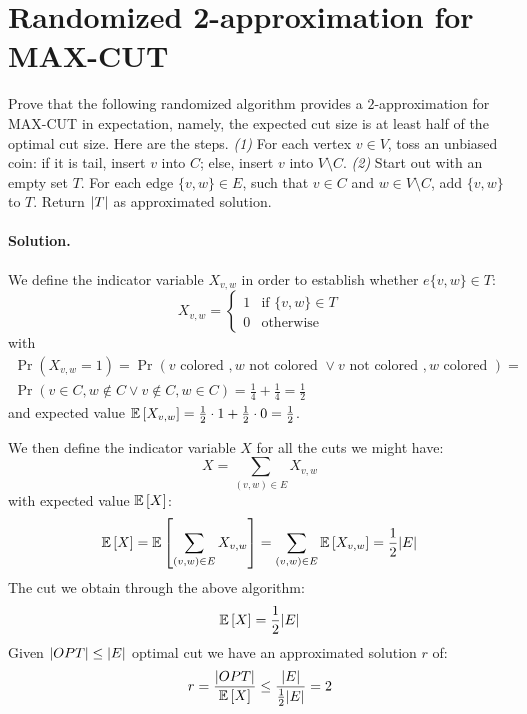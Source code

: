 \section{Randomized 2-approximation for MAX-CUT}

Prove  that  the  following  randomized algorithm provides a $2$-approximation for MAX-CUT in expectation, namely, the expected cut size is at least half of the optimal cut size.
Here are the steps.
\emph{(1)} For each vertex $v \in V$,  toss  an  unbiased  coin:  if  it  is  tail, insert $v$ into $C$; else, insert $v$ into $V \setminus C$.
\emph{(2)} Start out with an empty set $T$.
For each edge $\{v, w\} \in E$, such that $v \in C$ and $w \in V \setminus C$, add $\{v, w\}$ to $T$.
Return $\lvert T\rvert$ as approximated solution.

\vspace{0.5cm}
\paragraph{Solution.}
We define the indicator variable $X_{v, w}$ in order to establish whether $e\{v, w\} \in T$:
\begin{equation*}
X_{v, w} =   \begin{cases}
1   & \text{if } \{v, w\} \in T \\
0   & \text{otherwise}
\end{cases}
\end{equation*}
with 
\begin{gather*}
\Pr(X_{v, w} = 1) = \Pr(v \text{ colored }, w \text{ not colored } \lor v \text{ not colored }, w \text{ colored }) = \\
\Pr(v \in C, w \notin C \lor v \notin C, w \in C) =
\frac{1}{4} + \frac{1}{4} = \frac{1}{2}
\end{gather*}
and expected value $\mathbb{E}\left[{X_{v,w}}\right] = \frac{1}{2} \cdot 1 + \frac{1}{2} \cdot 0 = \frac{1}{2}$.

We then define the indicator variable $X$ for all the cuts we might have:
\begin{equation*}
X = \sum_{(v, w) \in E} X_{v, w}
\end{equation*}
with expected value $\mathbb{E}\left[{X}\right]$:
\begin{equation*}
\mathbb{E}\left[{X}\right] = \mathbb{E}\left[{\sum_{(v, w) \in E} X_{v, w}}\right] = \sum_{(v, w) \in E} \mathbb{E}\left[{X_{v, w}}\right] = \frac{1}{2} \lvert E\rvert
\end{equation*}
The cut we obtain through the above algorithm:
\begin{equation*}
\mathbb{E}\left[{X}\right] = \frac{1}{2} \lvert E\rvert
\end{equation*}
Given $\lvert OPT\rvert \leq \lvert E\rvert$ optimal cut we have an approximated solution $r$ of:
\begin{equation*}
r = \frac{\lvert OPT\rvert}{\mathbb{E}\left[{X}\right]} \leq \frac{\lvert E\rvert}{\frac{1}{2}\lvert E\rvert} = 2 
\end{equation*}